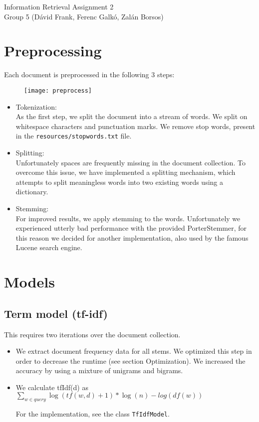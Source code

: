 \documentclass[12pt]{article}
\begin{document}
\begin{center}

{\Huge Information Retrieval Assignment 2} \\
\vspace{.5cm}
{\large Group 5 (Dávid Frank, Ferenc Galkó, Zalán Borsos)}
\end{center}

\vspace{1cm}

\section{Preprocessing}
Each document is preprocessed in the following 3 steps:
\begin{figure}[h]
\centering
\texttt{[image: preprocess]}
\end{figure}

\begin{itemize}
	\item Tokenization: \\
	As the first step, we split the document into a stream of words. We split on whitespace characters and punctuation marks. We remove stop words, present in the \texttt{resources/stopwords.txt} file.
	
	\item Splitting: \\
	Unfortunately spaces are frequently missing in the document collection. To overcome this issue, we have implemented a splitting mechanism, which attempts to split meaningless words into two existing words using a dictionary.
	\item Stemming: \\
	For improved results, we apply stemming to the words. Unfortunately we experienced utterly bad performance with the provided PorterStemmer, for this reason we decided for another implementation, also used by the famous Lucene search engine.
	
\end{itemize}


\section{Models}

\subsection{Term model (tf-idf)}
This requires two iterations over the document collection.
\begin{itemize}
	\item
	We extract document frequency data for all stems. We optimized this step in order to decrease the runtime (see section Optimization). We increased the accuracy by using a mixture of unigrams and bigrams. 
	\item 
	We calculate tfIdf(d) as
	$\sum_{w\in query} \log(tf(w, d) + 1) * \log(n)-log(df(w))$
	
	For the implementation, see the class \texttt{TfIdfModel}.
\end{itemize}
\end{document}
